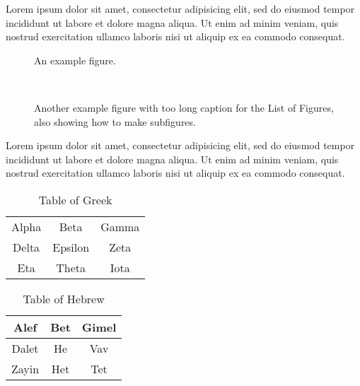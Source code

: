 Lorem ipsum dolor sit amet, consectetur adipisicing elit, sed do eiusmod tempor incididunt ut labore et dolore magna aliqua. Ut enim ad minim veniam, quis nostrud exercitation ullamco laboris nisi ut aliquip ex ea commodo consequat. 

\begin{figure}[htb]
\centering
\caption{An example figure.}
\label{fig:exfig}
\end{figure}
 
\begin{figure}[htb]
\centering
     \hspace{.1\textwidth}
     \\
     \vspace{.1\textwidth}
	 \hspace{.1\textwidth}
     \caption[Another example figure.]{Another example figure with too long caption for the List of Figures, also showing how to make subfigures.}
     \label{fig:ex2}
\end{figure}

Lorem ipsum dolor sit amet, consectetur adipisicing elit, sed do eiusmod tempor incididunt ut labore et dolore magna aliqua. Ut enim ad minim veniam, quis nostrud exercitation ullamco laboris nisi ut aliquip ex ea commodo consequat. 

\begin{table}[htbp]
  \centering 
  \begin{tabular}{|c|c|c|}
\hline
 Alpha  & Beta & Gamma \\
 Delta  & Epsilon & Zeta \\
 Eta  & Theta & Iota \\
\hline
\end{tabular}
  \caption{Table of Greek}\label{tab:stuff}
\end{table}

\begin{table}[htbp]
  \centering 
  \begin{tabular}{|c|c|c|}
\hline
 Alef  & Bet & Gimel \\ \hline
 Dalet  & He & Vav \\ \hline
 Zayin  & Het & Tet \\ \hline
\end{tabular}
  \caption{Table of Hebrew}\label{tab:mstuff}
\end{table}


